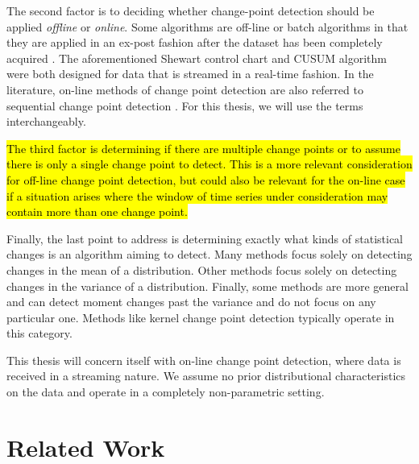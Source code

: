 The second factor is to deciding whether change-point detection should be applied \textit{offline} or \textit{online}. Some algorithms are off-line or batch algorithms in that they are applied in an ex-post fashion after the dataset has been completely acquired \cite{truong2018review}. The aforementioned Shewart control chart and CUSUM algorithm were both designed for data that is streamed in a real-time fashion. In the literature, on-line methods of change point detection are also referred to sequential change point detection  \cite{tartakovsky2014sequential}. For this thesis, we will use the terms interchangeably.%


\hl{The third factor is determining if there are multiple change points or to assume there is only a single change point to detect. This is a more relevant consideration for off-line change point detection, but could also be relevant for the on-line case if a situation arises where the window of time series under consideration may contain more than one change point.}

Finally, the last point to address is determining exactly what kinds of statistical changes is an algorithm aiming to detect. Many methods focus solely on detecting changes in the mean of a distribution. Other methods focus solely on detecting changes in the variance of a distribution. Finally, some methods are more general and can detect moment changes past the variance and do not focus on any particular one. Methods like kernel change point detection typically operate in this category. 

This thesis will concern itself with on-line change point detection, where data is received in a streaming nature. We assume no prior distributional characteristics on the data and operate in a completely non-parametric setting. 
\section{Related Work}

